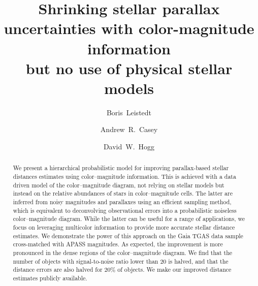 \documentclass[aps,prd,showpacs,superscriptaddress,groupedaddress]{revtex4}  %
\begin{document}
 
\title{Shrinking stellar parallax uncertainties with color-magnitude information \\
  but no use of physical stellar models}

\author{Boris~Leistedt}
  
\author{Andrew~R.~Casey}
 
\author{David~W.~Hogg}
  
\begin{abstract}
We present a hierarchical probabilistic model for improving parallax-based stellar distances estimates using color--magnitude information. 
This is achieved with a data driven model of the color--magnitude diagram, not relying on stellar models but instead on the  relative abundances of stars in color--magnitude cells.
The latter are inferred from noisy magnitudes and parallaxes using an efficient sampling method, which is equivalent to deconvolving observational errors into a probabilistic noiseless color--magnitude diagram.
While the latter can be useful for a range of applications, we focus on leveraging multicolor information to provide more accurate stellar distance estimates.
We demonstrate the power of this approach on the Gaia TGAS data sample cross-matched with APASS magnitudes.
As expected, the improvement is more pronounced in the dense regions of the color--magnitude diagram.
We find that the number of objects with signal-to-noise ratio lower than 20 is halved, and that the distance errors are also halved for 20\% of objects.
We make our improved distance estimates publicly available.
\end{abstract}


\maketitle

  
\end{document}
